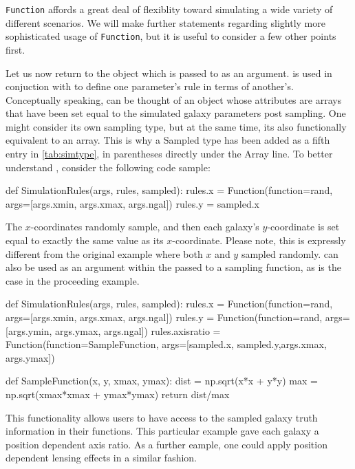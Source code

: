 \documentclass[12pt]{book}
\newcommand{\codett}[1]{\lstinline{#1}}
\begin{document}
\noindent \codett{Function} affords a great deal of flexiblity toward
simulating a wide variety of different scenarios.
We will make further statements regarding slightly more sophisticated usage
of \codett{Function}, but it is useful to consider a few other points first.

Let us now return to the \simsamp{} object which is passed to \simfunc{} as an argument.
\simsamp{} is used in conjuction with \simrules{} to define one parameter's rule in terms of another's.
Conceptually speaking, \simsamp{} can be thought of an object whose attributes are arrays that 
have been set equal to the simulated galaxy parameters post sampling.
One might consider \simsamp{} its own sampling type, but at the same time, its also functionally equivalent to an array.
This is why a Sampled type has been added as a fifth entry in \autoref{tab:simtype}, in parentheses directly under the Array line.
To better understand \simsamp{}, consider the following code sample:

\begin{code}
def SimulationRules(args, rules, sampled):
    rules.x = Function(function=rand, args=[args.xmin, args.xmax, args.ngal])
    rules.y = sampled.x
\end{code}

\noindent The $x$-coordinates randomly sample, and then each galaxy's $y$-coordinate
is set equal to exactly the same value as its $x$-coordinate.
Please note, this is expressly different from the original example where both $x$ and $y$ sampled randomly.
\simsamp{} can also be used as an argument within the \simargs{} passed to a sampling function,
as is the case in the proceeding example.

\begin{code}
def SimulationRules(args, rules, sampled):
    rules.x = Function(function=rand, args=[args.xmin, args.xmax, args.ngal])
    rules.y = Function(function=rand, args=[args.ymin, args.ymax, args.ngal])
    rules.axisratio = Function(function=SampleFunction, args=[sampled.x, sampled.y,args.xmax, args.ymax])

def SampleFunction(x, y, xmax, ymax):
    dist = np.sqrt(x*x + y*y)
    max = np.sqrt(xmax*xmax + ymax*ymax)
    return dist/max
\end{code}

\noindent This functionality allows users to have access to the sampled galaxy truth
information in their functions.
This particular example gave each galaxy a position dependent axis ratio.
As a further eample, one could apply position dependent lensing effects in a similar fashion.
\end{document}
